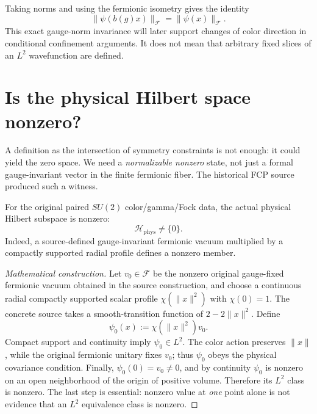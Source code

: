 Taking norms and using the fermionic isometry gives the identity
\begin{equation}\label{eq:gauge-norm}
 \|\psi(b(g)x)\|_{\mathcal F}=\|\psi(x)\|_{\mathcal F}.
\end{equation}
This exact gauge-norm invariance will later support changes of color
direction in conditional confinement arguments. It does not mean that
arbitrary fixed slices of an $L^2$ wavefunction are defined.

\section{Is the physical Hilbert space nonzero?}
A definition as the intersection of symmetry constraints is not enough:
it could yield the zero space. We need a \emph{normalizable nonzero} state,
not just a formal gauge-invariant vector in the finite fermionic fiber.
The historical FCP source produced such a witness.

\begin{theorem}\label{thm:physical-nonzero}
For the original paired $SU(2)$ color/gamma/Fock data, the actual physical
Hilbert subspace is nonzero:
\begin{equation}\label{eq:physical-nonzero}
 \mathscr H_{\mathrm{phys}}\neq\{0\}.
\end{equation}
Indeed, a source-defined gauge-invariant fermionic vacuum multiplied by
a compactly supported radial profile defines a nonzero member.
\end{theorem}
\begin{proof}[Mathematical construction]
Let $v_0\in\mathcal F$ be the nonzero original gauge-fixed fermionic
vacuum obtained in the source construction, and choose a continuous radial
compactly supported scalar profile $\chi(\|x\|^2)$ with $\chi(0)=1$.
The concrete source takes a smooth-transition function of
$2-2\|x\|^2$. Define
\begin{equation}\label{eq:radial-bump}
 \psi_0(x):=\chi(\|x\|^2)v_0.
\end{equation}
Compact support and continuity imply $\psi_0\in L^2$. The color action
preserves $\|x\|$, while the original fermionic unitary fixes $v_0$;
thus $\psi_0$ obeys the physical covariance condition. Finally,
$\psi_0(0)=v_0\ne0$, and by continuity $\psi_0$ is nonzero on an open
neighborhood of the origin of positive volume. Therefore its $L^2$ class
is nonzero. The last step is essential: nonzero value at \emph{one}
point alone is not evidence that an $L^2$ equivalence class is nonzero.
\end{proof}

